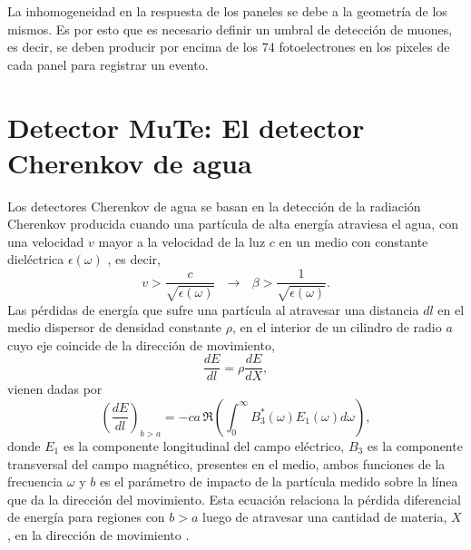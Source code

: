 \documentclass[12pt,oneside,openany,letter]{book}
\begin{document}
La inhomogeneidad en la respuesta de los paneles se debe a la geometría de los mismos. Es por esto que es necesario definir un umbral de detección de muones, es decir, se deben producir por encima de los 74 fotoelectrones en los pixeles de cada panel para registrar un evento.
\chapter{Detector MuTe: El detector Cherenkov de agua}\label{cap4}
Los detectores Cherenkov de agua se basan en la detección de la radiación Cherenkov producida cuando una partícula de alta energía atraviesa el agua, con una velocidad $v$ mayor a la velocidad de la luz $c$ en un medio con constante dieléctrica $\epsilon(\omega)$ \cite{Asorey-phd2012}, es decir, 
\begin{equation}
v > \frac{c}{\sqrt{\epsilon(\omega)}} \,\,\,\, \rightarrow \,\,\,\, \beta > \frac{1}{\sqrt{\epsilon(\omega)}}. 
\end{equation}
Las pérdidas de energía que sufre una partícula al atravesar una distancia $dl$ en el medio dispersor de densidad constante $\rho$, en el interior de un cilindro de radio $a$ cuyo eje coincide de la dirección de movimiento,
\begin{equation}
\frac{dE}{dl} = \rho \frac{dE}{dX},
\end{equation}
vienen dadas por
\begin{equation}
\label{Fermi}
\left ( \frac{dE}{dl} \right )_{b>a} = - ca \,\Re \left ( \int_{0}^{\infty} B_{3}^{*}(\omega) E_{1}(\omega)d\omega \right ),
\end{equation}
donde $E_1$ es la componente longitudinal del campo eléctrico, $B_3$ es la componente transversal del campo magnético, presentes en el medio, ambos funciones de la frecuencia $\omega$ y $b$ es el par\'ametro de impacto de la part\'icula medido sobre la l\'inea que da la direcci\'on del movimiento. Esta ecuación relaciona la pérdida diferencial de energía para regiones con $b>a$ luego de atravesar una cantidad de materia, $X$, en la dirección de movimiento \cite{Asorey-phd2012}.  
\end{document}
